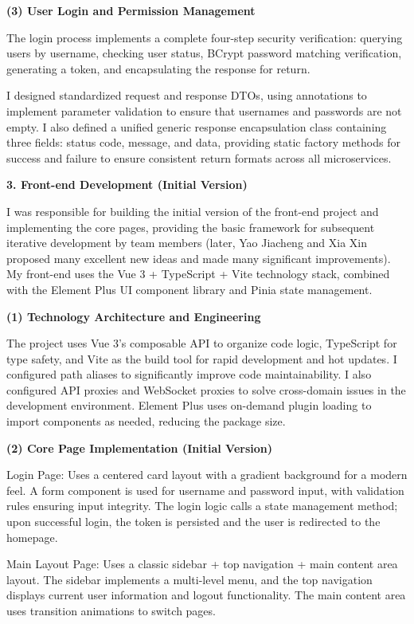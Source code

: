 \textbf{(3) User Login and Permission Management}

The login process implements a complete four-step security verification: querying users by username, checking user status, BCrypt password matching verification, generating a token, and encapsulating the response for return.

I designed standardized request and response DTOs, using annotations to implement parameter validation to ensure that usernames and passwords are not empty. I also defined a unified generic response encapsulation class containing three fields: status code, message, and data, providing static factory methods for success and failure to ensure consistent return formats across all microservices.

\textbf{3. Front-end Development (Initial Version)}

I was responsible for building the initial version of the front-end project and implementing the core pages, providing the basic framework for subsequent iterative development by team members (later, Yao Jiacheng and Xia Xin proposed many excellent new ideas and made many significant improvements). My front-end uses the Vue 3 + TypeScript + Vite technology stack, combined with the Element Plus UI component library and Pinia state management.

\textbf{(1) Technology Architecture and Engineering}

The project uses Vue 3's composable API to organize code logic, TypeScript for type safety, and Vite as the build tool for rapid development and hot updates. I configured path aliases to significantly improve code maintainability. I also configured API proxies and WebSocket proxies to solve cross-domain issues in the development environment. Element Plus uses on-demand plugin loading to import components as needed, reducing the package size.

\textbf{(2) Core Page Implementation (Initial Version)}

Login Page: Uses a centered card layout with a gradient background for a modern feel. A form component is used for username and password input, with validation rules ensuring input integrity. The login logic calls a state management method; upon successful login, the token is persisted and the user is redirected to the homepage.

Main Layout Page: Uses a classic sidebar + top navigation + main content area layout. The sidebar implements a multi-level menu, and the top navigation displays current user information and logout functionality. The main content area uses transition animations to switch pages.

